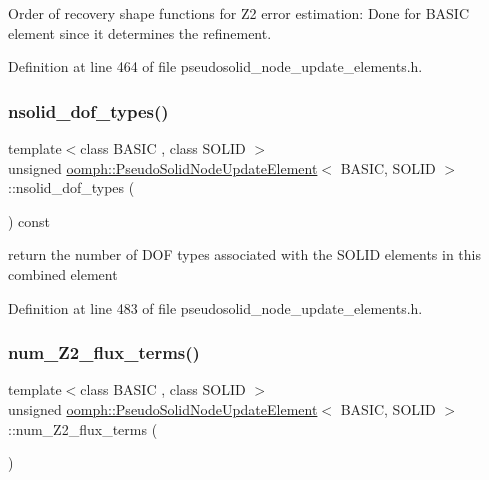 Order of recovery shape functions for Z2 error estimation\+: Done for B\+A\+S\+IC element since it determines the refinement. 



Definition at line 464 of file pseudosolid\+\_\+node\+\_\+update\+\_\+elements.\+h.

\mbox{\label{classoomph_1_1PseudoSolidNodeUpdateElement_a20d4f8be49920f8599b60981b1b1775f}} 
\subsubsection{\texorpdfstring{nsolid\+\_\+dof\+\_\+types()}{nsolid\_dof\_types()}}
{\footnotesize\ttfamily template$<$class B\+A\+S\+IC , class S\+O\+L\+ID $>$ \\
unsigned \hyperlink{classoomph_1_1PseudoSolidNodeUpdateElement}{oomph\+::\+Pseudo\+Solid\+Node\+Update\+Element}$<$ B\+A\+S\+IC, S\+O\+L\+ID $>$\+::nsolid\+\_\+dof\+\_\+types (\begin{DoxyParamCaption}{ }\end{DoxyParamCaption}) const\hspace{0.3cm}{\ttfamily [inline]}}



return the number of D\+OF types associated with the S\+O\+L\+ID elements in this combined element 



Definition at line 483 of file pseudosolid\+\_\+node\+\_\+update\+\_\+elements.\+h.

\mbox{\label{classoomph_1_1PseudoSolidNodeUpdateElement_adbda8595ca36cd972870af6f1e498601}} 
\subsubsection{\texorpdfstring{num\+\_\+\+Z2\+\_\+flux\+\_\+terms()}{num\_Z2\_flux\_terms()}}
{\footnotesize\ttfamily template$<$class B\+A\+S\+IC , class S\+O\+L\+ID $>$ \\
unsigned \hyperlink{classoomph_1_1PseudoSolidNodeUpdateElement}{oomph\+::\+Pseudo\+Solid\+Node\+Update\+Element}$<$ B\+A\+S\+IC, S\+O\+L\+ID $>$\+::num\+\_\+\+Z2\+\_\+flux\+\_\+terms (\begin{DoxyParamCaption}{ }\end{DoxyParamCaption})\hspace{0.3cm}{\ttfamily [inline]}}



